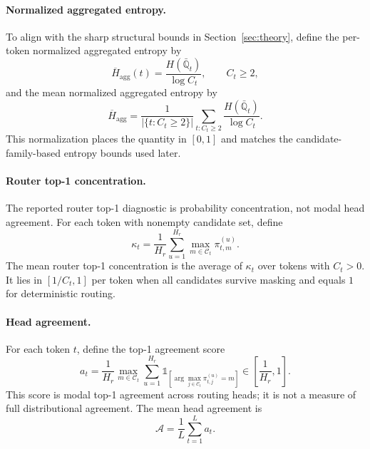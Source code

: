 \documentclass{article}
\newcommand{\mathbbm}[1]{\mathds{#1}}
\theoremstyle{plain}
\theoremstyle{definition}
\theoremstyle{remark}
\begin{document}
\paragraph{Normalized aggregated entropy.}
To align with the sharp structural bounds in Section~\ref{sec:theory}, define the per-token normalized aggregated entropy by
\begin{equation}
\label{eq:normalized-agg-entropy-token}
\overline H_{\mathrm{agg}}(t)
=
\frac{H(\bar{\mathbb Q}_t)}{\log C_t},
\qquad C_t\ge 2,
\end{equation}
and the mean normalized aggregated entropy by
\begin{equation}
\label{eq:normalized-agg-entropy}
\overline H_{\mathrm{agg}}
=
\frac{1}{|\{t:C_t\ge 2\}|}
\sum_{t:C_t\ge 2}
\frac{H(\bar{\mathbb Q}_t)}{\log C_t}.
\end{equation}
This normalization places the quantity in $[0,1]$ and matches the candidate-family-based entropy bounds used later.

\paragraph{Router top-1 concentration.}
The reported router top-1 diagnostic is probability concentration, not modal head agreement. For each token with nonempty candidate set, define
\begin{equation}
\label{eq:router-top1-concentration-token}
\kappa_t=\frac{1}{H_r}\sum_{u=1}^{H_r}\max_{m\in\mathcal C_t}\pi_{t,m}^{(u)}.
\end{equation}
The mean router top-1 concentration is the average of $\kappa_t$ over tokens with $C_t>0$. It lies in $[1/C_t,1]$ per token when all candidates survive masking and equals $1$ for deterministic routing.

\paragraph{Head agreement.}
For each token $t$, define the top-1 agreement score
\begin{equation}
\label{eq:head-agreement-token}
a_t
=
\frac{1}{H_r}
\max_{m\in\mathcal{C}_t}
\sum_{u=1}^{H_r}
\mathbbm{1}_{\left[\arg\max_{j\in\mathcal{C}_t} \pi_{t,j}^{(u)}=m\right]}
\in\left[\frac{1}{H_r},1\right].
\end{equation}
This score is modal top-1 agreement across routing heads; it is not a measure of full distributional agreement.
The mean head agreement is
\begin{equation}
\label{eq:head-agreement}
\mathcal A
=
\frac{1}{L}\sum_{t=1}^L a_t.
\end{equation}
\end{document}
